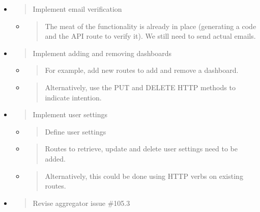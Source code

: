 \begin{itemize}
\item
  \begin{quote}
  Implement email verification
  \end{quote}

  \begin{itemize}
  \item
    \begin{quote}
    The meat of the functionality is already in place (generating a code
    and the API route to verify it). We still need to send actual
    emails.
    \end{quote}
  \end{itemize}
\item
  \begin{quote}
  Implement adding and removing dashboards
  \end{quote}

  \begin{itemize}
  \item
    \begin{quote}
    For example, add new routes to add and remove a dashboard.
    \end{quote}
  \item
    \begin{quote}
    Alternatively, use the PUT and DELETE HTTP methods to indicate
    intention.
    \end{quote}
  \end{itemize}
\item
  \begin{quote}
  Implement user settings
  \end{quote}

  \begin{itemize}
  \item
    \begin{quote}
    Define user settings
    \end{quote}
  \item
    \begin{quote}
    Routes to retrieve, update and delete user settings need to be
    added.
    \end{quote}
  \item
    \begin{quote}
    Alternatively, this could be done using HTTP verbs on existing
    routes.
    \end{quote}
  \end{itemize}
\item
  \begin{quote}
  Revise aggregator issue \#105.3
  \end{quote}
\end{itemize}

